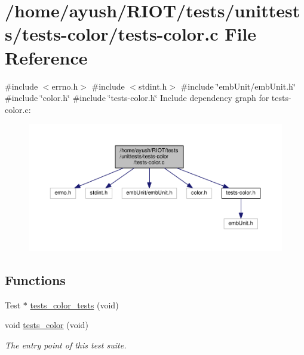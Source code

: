 \hypertarget{tests-color_8c}{}\section{/home/ayush/\+R\+I\+O\+T/tests/unittests/tests-\/color/tests-\/color.c File Reference}
\label{tests-color_8c}
{\ttfamily \#include $<$errno.\+h$>$}\newline
{\ttfamily \#include $<$stdint.\+h$>$}\newline
{\ttfamily \#include \char`\"{}emb\+Unit/emb\+Unit.\+h\char`\"{}}\newline
{\ttfamily \#include \char`\"{}color.\+h\char`\"{}}\newline
{\ttfamily \#include \char`\"{}tests-\/color.\+h\char`\"{}}\newline
Include dependency graph for tests-\/color.c\+:
\nopagebreak
\begin{figure}[H]
\begin{center}
\leavevmode
\includegraphics[width=350pt]{tests-color_8c__incl}
\end{center}
\end{figure}
\subsection*{Functions}
\textbf{ }\par
\begin{DoxyCompactItemize}
\item 
Test $\ast$ \hyperlink{tests-color_8c_a1cf5866040e284d76c57251551585fee}{tests\+\_\+color\+\_\+tests} (void)
\item 
void \hyperlink{group__unittests_ga211fe87abc68d3c2ef15a3db1dfbcb48}{tests\+\_\+color} (void)
\begin{DoxyCompactList}\small\item\em The entry point of this test suite. \end{DoxyCompactList}\end{DoxyCompactItemize}



